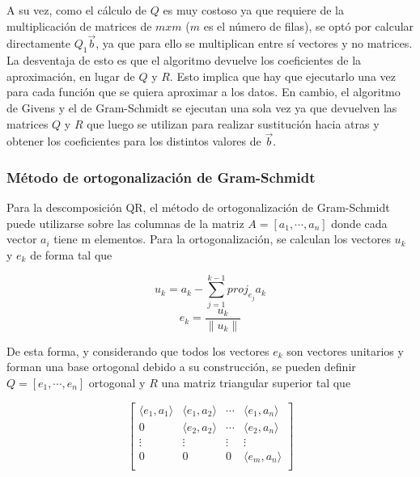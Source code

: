 \documentclass[journal, monochrome]{IEEEtran}
\begin{document}
\par
A su vez, como el cálculo de $Q$ es muy costoso ya que requiere de la multiplicación de matrices de $mxm$ ($m$ es el número de filas), se optó por calcular directamente $Q_{1}\vec{b}$, ya que para ello se multiplican entre sí vectores y no matrices. La desventaja de esto es que el algoritmo devuelve los coeficientes de la aproximación, en lugar de $Q$ y $R$. Esto implica que hay que ejecutarlo una vez para cada función que se quiera aproximar a los datos. En cambio, el algoritmo de Givens y el de Gram-Schmidt se ejecutan una sola vez ya que devuelven las matrices $Q$ y $R$ que luego se utilizan para realizar sustitución hacia atras y obtener los coeficientes para los distintos valores de $\vec{b}$.


\vspace{0.5cm}
\subsubsection{Método de ortogonalización de Gram-Schmidt}
\par
Para la descomposición QR, el método de ortogonalización de Gram-Schmidt puede utilizarse sobre las columnas de la matriz $ A = [ a_1, \cdots , a_n ] $ donde cada vector $a_{i}$ tiene m elementos. Para la ortogonalización, se calculan los vectores $u_k$ y $e_k$ de forma tal que

\begin{equation}
u_{k} = a_{k} - \sum_{j=1}^{k-1} proj_{e_{j}}a_{k}
\end{equation}
\begin{equation}
e_{k} = \frac{u_k}{\parallel u_k \parallel}
\end{equation}

De esta forma, y considerando que todos los vectores $e_k$ son vectores unitarios y forman una base ortogonal debido a su construcción, se pueden definir $ Q = [ e_1, \cdots , e_n ] $ ortogonal y $R$ una matriz triangular superior tal que

\begin{equation}
\left[
\begin{array}{cccc}
\langle e_1, a_1 \rangle & \langle e_1, a_2 \rangle & \cdots & \langle e_1, a_n \rangle \\
0 & \langle e_2, a_2 \rangle & \cdots & \langle e_2, a_n \rangle \\
\vdots & \vdots & \vdots & \vdots \\
0 & 0 & 0 & \langle e_m, a_n \rangle \\
\end{array}
\right]
\end{equation}
\end{document}
